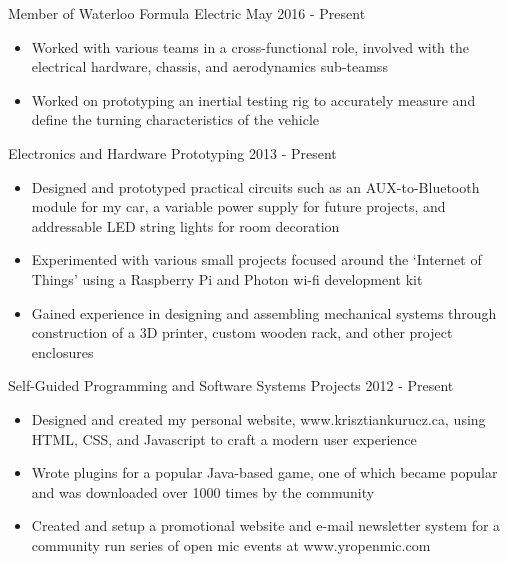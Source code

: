 \documentclass[hidelinks]{kkurucz-cv}
\begin{document}
\begin{entrylist}
\entry
{\vspace{-9mm}\null}
{Member of Waterloo Formula Electric}
{May 2016 - Present}
{
\vspace{-3mm}
\begin{itemize}
	\item Worked with various teams in a cross-functional role, involved with the electrical hardware, chassis, and aerodynamics sub-teamss
	\item Worked on prototyping an inertial testing rig to accurately measure and define the turning characteristics of the vehicle
\end{itemize}
}
{\null}
\entry
{\vspace{-9mm}\null}
{Electronics and Hardware Prototyping}
{2013 - Present}
{
\vspace{-3mm}
\begin{itemize}
	\item Designed and prototyped practical circuits such as an AUX-to-Bluetooth module for my car, a variable power supply for future projects, and addressable LED string lights for room decoration
	\item Experimented with various small projects focused around the ‘Internet of Things’ using a Raspberry Pi and Photon wi-fi development kit
	\item Gained experience in designing and assembling mechanical systems through construction of a 3D printer, custom wooden rack, and other project enclosures
\end{itemize}
}
{\null}
\entry
{\vspace{-9mm}\null}
{Self-Guided Programming and Software Systems Projects}
{2012 - Present}
{
\vspace{-3mm}
\begin{itemize}
	\item Designed and created my personal website, www.krisztiankurucz.ca, using HTML, CSS, and Javascript to craft a modern user experience
	\item Wrote plugins for a popular Java-based game, one of which became popular and was downloaded over 1000 times by the community
	\item Created and setup a promotional website and e-mail newsletter system for a community run series of open mic events at www.yropenmic.com
\end{itemize}
}
\end{entrylist}
\end{document}
